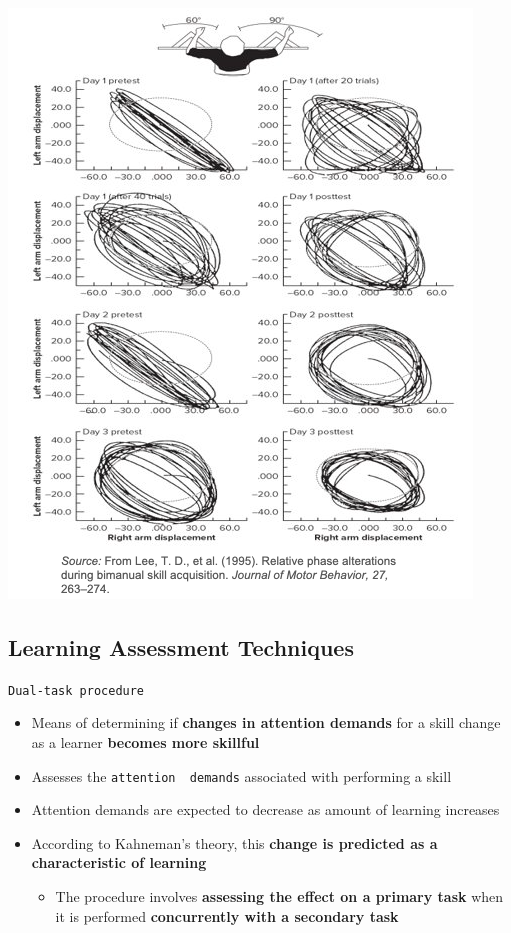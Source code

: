 \documentclass[
  letterpaper,
  DIV=11,
  numbers=noendperiod]{scrartcl}
\providecommand{\tightlist}{%
  \setlength{\itemsep}{0pt}\setlength{\parskip}{0pt}}\usepackage{longtable,booktabs,array}
\begin{document}
\includegraphics{images/Screenshot 2023-09-11 at 11.20.22 AM.png}

\hypertarget{learning-assessment-techniques-5}{%
\subsection{Learning Assessment
Techniques}\label{learning-assessment-techniques-5}}

\texttt{Dual-task\ procedure}

\begin{itemize}
\tightlist
\item
  Means of determining if \textbf{changes in attention demands} for a
  skill change as a learner \textbf{becomes more skillful}
\item
  Assesses the \texttt{attention\ \ demands} associated with perform­ing
  a skill
\item
  Attention demands are expected to decrease as amount of learning
  increases\hspace{0pt}
\item
  According to Kahneman's theory, this \textbf{change is predicted as a
  characteristic of learning}\hspace{0pt}

  \begin{itemize}
  \tightlist
  \item
    The procedure involves \textbf{assessing the effect on a primary
    task} when it is performed \textbf{concurrently with a secondary
    task}
  \end{itemize}
\end{itemize}
\end{document}

